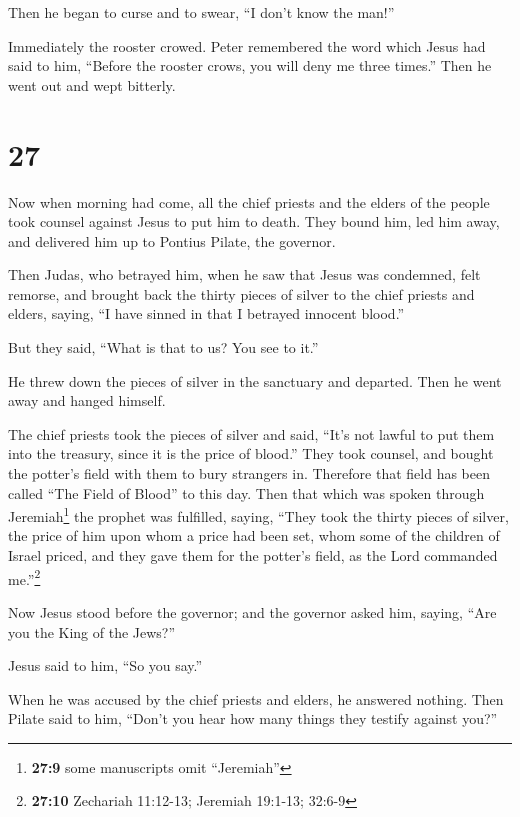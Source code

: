  Then he began to curse and to swear, ``I don't know the
man!''

Immediately the rooster crowed.  Peter remembered the
word which Jesus had said to him, ``Before the rooster crows, you will
deny me three times.'' Then he went out and wept bitterly.

\hypertarget{section-26}{%
\section{27}\label{section-26}}

 Now when morning had come, all the chief priests and the
elders of the people took counsel against Jesus to put him to death.
 They bound him, led him away, and delivered him up to
Pontius Pilate, the governor.

 Then Judas, who betrayed him, when he saw that Jesus was
condemned, felt remorse, and brought back the thirty pieces of silver to
the chief priests and elders,  saying, ``I have sinned in
that I betrayed innocent blood.''

But they said, ``What is that to us? You see to it.''

 He threw down the pieces of silver in the sanctuary and
departed. Then he went away and hanged himself.

 The chief priests took the pieces of silver and said,
``It's not lawful to put them into the treasury, since it is the price
of blood.''  They took counsel, and bought the potter's
field with them to bury strangers in.  Therefore that
field has been called ``The Field of Blood'' to this day. 
Then that which was spoken through Jeremiah\footnote{\textbf{27:9} some
  manuscripts omit ``Jeremiah''} the prophet was fulfilled, saying,
``They took the thirty pieces of silver, the price of him upon whom a
price had been set, whom some of the children of Israel priced,
 and they gave them for the potter's field, as the Lord
commanded me.''\footnote{\textbf{27:10} Zechariah 11:12-13; Jeremiah
  19:1-13; 32:6-9}

 Now Jesus stood before the governor; and the governor
asked him, saying, ``Are you the King of the Jews?''

Jesus said to him, ``So you say.''

 When he was accused by the chief priests and elders, he
answered nothing.  Then Pilate said to him, ``Don't you
hear how many things they testify against you?''

